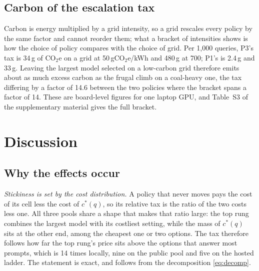 \documentclass[final,5p,times,twocolumn]{elsarticle}
\theoremstyle{plain}
\newcommand{\cstar}{c^{*}}
\begin{document}
\subsection{Carbon of the escalation tax}
\label{sec:results-carbon}

Carbon is energy multiplied by a grid intensity, so a grid rescales every
policy by the same factor and cannot reorder them; what a bracket of
intensities shows is how the choice of policy compares with the choice of
grid. Per 1{,}000 queries, P3's tax is 34\,g of CO$_2$e on a grid at
50\,gCO$_2$e/kWh and 480\,g at 700; P1's is 2.4\,g and 33\,g. Leaving the
largest model selected on a low-carbon grid therefore emits about as much
excess carbon as the frugal climb on a coal-heavy one, the tax differing by a
factor of 14.6 between the two policies where the bracket spans a factor of
14. These are board-level figures for one laptop GPU, and Table~S3 of the
supplementary material gives the full bracket.

\section{Discussion}
\label{sec:discussion}

\subsection{Why the effects occur}
\label{sec:why}

\emph{Stickiness is set by the cost distribution.} A policy that never moves
pays the cost of its cell less the cost of $\cstar(q)$, so its relative tax
is the ratio of the two costs less one. All three pools share a shape that
makes that ratio large: the top rung combines the largest model with its
costliest setting, while the mass of $\cstar(q)$ sits at the other end, among
the cheapest one or two options. The tax therefore follows how far the top
rung's price sits above the options that answer most prompts, which is 14
times locally, nine on the public pool and five on the hosted ladder. The
statement is exact, and follows from the decomposition \eqref{eq:decomp}.
\end{document}
